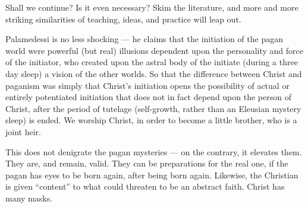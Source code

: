Shall we continue? Is it even necessary? Skim the literature, and more and more striking similarities of teaching, ideas, and practice will leap out.

Palamedessi is no less shocking --- he claims that the initiation of the pagan world were powerful (but real) illusions dependent upon the personality and force of the initiator, who created upon the astral body of the initiate (during a three day sleep) a vision of the other worlds. So that the difference between Christ and paganism was simply that Christ's initiation opens the possibility of actual or entirely potentiated initiation that does not in fact depend upon the person of Christ, after the period of tutelage (self-growth, rather than an Eleusian mystery sleep) is ended. We worship Christ, in order to become a little brother, who is a joint heir.

This does not denigrate the pagan mysteries --- on the contrary, it elevates them. They are, and remain, valid. They can be preparations for the real one, if the pagan has eyes to be born again, after being born again. Likewise, the Christian is given ``content'' to what could threaten to be an abstract faith. Christ has many masks.

